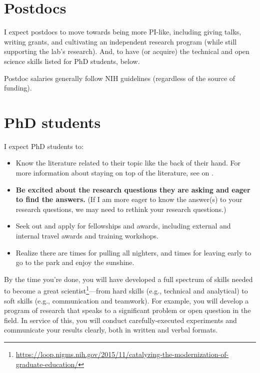 \documentclass[letterpaper,12pt,oneside]{memoir}
\begin{document}
\section{Postdocs}

I expect postdocs to move towards being more PI-like, including giving talks, writing grants, and cultivating an independent research program (while still supporting the lab's research). And, to have (or acquire) the technical and open science skills listed for PhD students, below.


Postdoc salaries generally follow NIH guidelines (regardless of the source of funding).

\section{PhD students}

I expect PhD students to:

\begin{itemize}
\item Know the literature related to their topic like the back of their hand. For more information about staying on top of the literature, see  on .
\item \textbf{Be excited about the research questions they are asking and eager to find the answers.} (If I am more eager to know the answer(s) to your research questions, we may need to rethink your research questions.)
\item Seek out and apply for fellowships and awards, including external and internal travel awards and training workshops.
\item Realize there are times for pulling all nighters, and times for leaving early to go to the park and enjoy the sunshine.
\end{itemize}

By the time you're done, you will have developed a full spectrum of skills needed to become a great scientist\footnote{\url{https://loop.nigms.nih.gov/2015/11/catalyzing-the-modernization-of-graduate-education/}}---from hard skills (e.g., technical and analytical) to soft skills (e.g., communication and teamwork). For example, you will develop a program of research that speaks to a significant problem or open question in the field. In service of this, you will conduct carefully-executed experiments and communicate your results clearly, both in written and verbal formats. 
\end{document}

